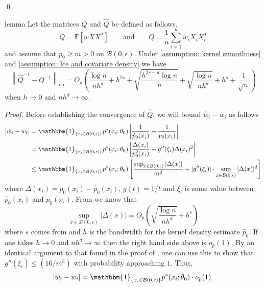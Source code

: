 \documentclass[11pt]{article}
\begin{document}
\qed{}


\begin{restatable}{lemma}{}
    Let the matrices $Q$ and $\hat{Q}$ be defined as follows, 
    \begin{equation}
    Q = \mathbb{E}\left[wXX^T\right] \qquad \text{and} \qquad \hat{Q} = \frac{1}{n}\sum_{i = 1}^n\hat{w}_iX_iX_i^T
    \end{equation}
    and assume that $p_0 \geq m > 0$ on $\mathcal{B}(0, \epsilon)$. Under \cref{assumption: kernel smoothness} and \cref{assumption: lce and covariate density} we have 
    \[\left\|\hat{Q}^{-1} - Q^{-1}\right\|_{\text{op}} = O_p\left(\frac{\log n}{nh^d} + h^{2s} + \sqrt{\frac{h^{2s-d}\log n}{n}} + \sqrt{\frac{\log n}{nh^d}} + h^s + \frac{1}{\sqrt{n}}\right)\]
    when $h \rightarrow 0$ and $nh^d \rightarrow \infty$. 
    \label{lemma: Q convergence}
\end{restatable}
\noindent \textit{Proof.} Before establishing the convergence of $\hat{Q}$, we will bound $\hat{w}_i - w_i$ as follows
\begin{align*}
    |\hat{w}_i - w_i| &= \mathbbm{1}_{\{x_i \in \mathcal{B}(0, \epsilon)\}}p^*(x_i;\theta_0) \left|\frac{1}{\hat{p}_0(x_i)} - \frac{1}{p_0(x_i)}\right| \\
    &=  \mathbbm{1}_{\{x_i \in \mathcal{B}(0, \epsilon)\}}p^*(x_i;\theta_0) \left|\frac{\Delta(x_i)}{p^2_0(x_i)} + g''(\xi_i)\Delta(x_i)^2\right| \\
    &\leq \mathbbm{1}_{\{x_i \in \mathcal{B}(0, \epsilon)\}}p^*(x_i;\theta_0) \left[\frac{ \sup_{x \in \mathcal{B}(0, \epsilon)}|\Delta(x)|}{m^2} + |g''(\xi_i)|\cdot \sup_{x \in \mathcal{B}(0, \epsilon)}|\Delta(x)|^2\right]
\end{align*}
where $\Delta(x_i) = p_0(x_i) - \hat{p}_0(x_i)$, $g(t) = 1/t$ and $\xi_i$ is some value between $\hat{p}_0(x_i)$ and $p_0(x_i)$. From  we know that 
\begin{equation}
    \sup_{x \in \mathcal{B}(0, \epsilon)} |\Delta(x)| = O_p\left(\sqrt{\frac{\log n}{nh^d}} + h^s\right)
\end{equation}
where $s$ comes from  and $h$ is the bandwidth for the kernel density estimate $\hat{p}_0$. If one takes $h \rightarrow 0$ and $nh^d \rightarrow \infty$ then the right hand side above is $o_p(1)$. By an identical argument to that found in the proof of , one can use this to show that $g''(\xi_i) \leq (16/m^3)$ with probability approaching $1$. Thus,
\begin{equation*}
     |\hat{w}_i - w_i| = \mathbbm{1}_{\{x_i \in \mathcal{B}(0, \epsilon)\}}p^*(x_i;\theta_0) \cdot o_p(1).
\end{equation*}
\end{document}
